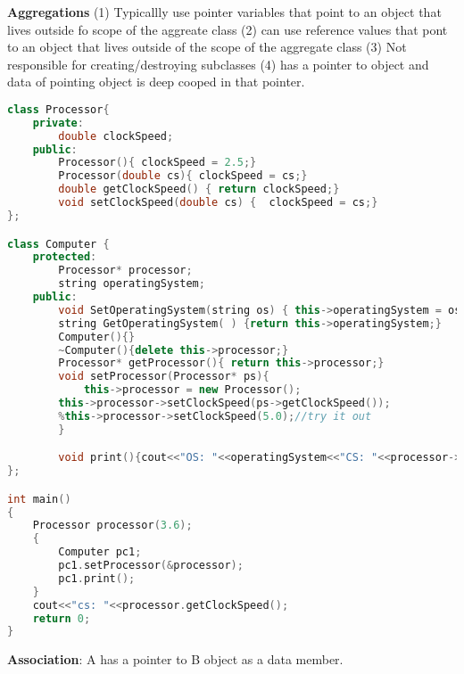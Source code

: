 \documentclass{book}
\begin{document}
\textbf{Aggregations} (1) Typicallly use pointer variables that point to an object that lives outside fo scope of the aggreate class
(2) can use reference values that pont to an object that lives outside of the scope of the aggregate class
(3) Not responsible for creating/destroying subclasses
(4) has a pointer to object and data of pointing object is deep cooped in that pointer.
\begin{lstlisting}[caption={Aggregation example}, language=C++]
class Processor{
    private:
        double clockSpeed;
    public:
        Processor(){ clockSpeed = 2.5;}
        Processor(double cs){ clockSpeed = cs;}
        double getClockSpeed() { return clockSpeed;}
        void setClockSpeed(double cs) {  clockSpeed = cs;}
};

class Computer {
    protected:
        Processor* processor;
        string operatingSystem;
    public:
        void SetOperatingSystem(string os) { this->operatingSystem = os;}
        string GetOperatingSystem( ) {return this->operatingSystem;}
        Computer(){}
        ~Computer(){delete this->processor;}
        Processor* getProcessor(){ return this->processor;}
        void setProcessor(Processor* ps){
            this->processor = new Processor();
        this->processor->setClockSpeed(ps->getClockSpeed());
        %this->processor->setClockSpeed(5.0);//try it out
        }

        void print(){cout<<"OS: "<<operatingSystem<<"CS: "<<processor->getClockSpeed(); }
};

int main()
{
    Processor processor(3.6);
    {
        Computer pc1;
        pc1.setProcessor(&processor);
        pc1.print();
    }
    cout<<"cs: "<<processor.getClockSpeed();
    return 0;
}
\end{lstlisting}



\textbf{Association}: A has a pointer to B object as a data member.
\end{document}
